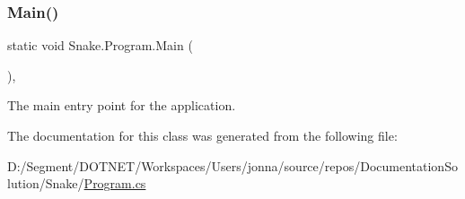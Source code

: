 \subsubsection{\texorpdfstring{Main()}{Main()}}
{\footnotesize\ttfamily static void Snake.\+Program.\+Main (\begin{DoxyParamCaption}{ }\end{DoxyParamCaption})\hspace{0.3cm}{\ttfamily [static]}, {\ttfamily [private]}}



The main entry point for the application. 



The documentation for this class was generated from the following file\+:\begin{DoxyCompactItemize}
\item 
D\+:/\+Segment/\+D\+O\+T\+N\+E\+T/\+Workspaces/\+Users/jonna/source/repos/\+Documentation\+Solution/\+Snake/\mbox{\hyperlink{_program_8cs}{Program.\+cs}}\end{DoxyCompactItemize}
